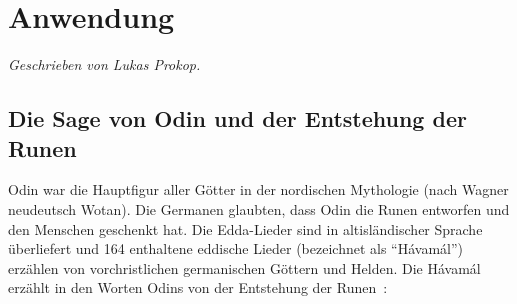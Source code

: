 \documentclass[a4paper]{scrartcl}
\begin{document}
%

%

\newpage

\section{Anwendung}
\emph{Geschrieben von Lukas Prokop.}

\subsection{Die Sage von Odin und der Entstehung der Runen}
%
Odin war die Hauptfigur aller Götter in der nordischen Mythologie (nach Wagner neudeutsch \glqq Wotan\grqq). Die Germanen glaubten, dass Odin die Runen entworfen und den Menschen geschenkt hat. Die Edda-Lieder sind in altisländischer Sprache überliefert und 164 enthaltene eddische Lieder (bezeichnet als \enquote{Hávamál}) erzählen von vorchristlichen germanischen Göttern und Helden. Die Hávamál erzählt in den Worten Odins von der Entstehung der Runen~\cite{havamal}:
\end{document}
